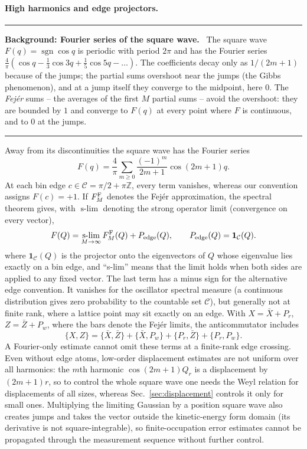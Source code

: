 \documentclass[11pt,a4paper]{article}
\newcommand{\sgn}{\operatorname{sgn}}
\newenvironment{background}[1]{\par\medskip\noindent\hrule\smallskip\noindent\textbf{Background: #1.}\ \ignorespaces}{\par\smallskip\noindent\hrule\medskip}
\begin{document}
\paragraph{High harmonics and edge projectors.}
\begin{background}{Fourier series of the square wave}
The square wave $F(q)=\sgn\cos q$ is periodic with period $2\pi$ and has the Fourier series $\frac4\pi(\cos q-\frac13\cos3q+\frac15\cos5q-\dots)$. The coefficients decay only as $1/(2m+1)$ because of the jumps; the partial sums overshoot near the jumps (the Gibbs phenomenon), and at a jump itself they converge to the midpoint, here $0$. The \emph{Fej\'er} sums -- the averages of the first $M$ partial sums -- avoid the overshoot: they are bounded by $1$ and converge to $F(q)$ at every point where $F$ is continuous, and to $0$ at the jumps.
\end{background}
Away from its discontinuities the square wave has the Fourier series
\begin{equation*}
F(q)=\frac4\pi\sum_{m\ge0}\frac{(-1)^m}{2m+1}\cos(2m+1)q .
\end{equation*}
At each bin edge $c\in\mathcal C=\pi/2+\pi\mathbb Z$, every term vanishes, whereas our convention assigns $F(c)=+1$. If $F_M^{\rm F}$ denotes the Fej\'er approximation, the spectral theorem gives, with $\operatorname{s-lim}$ denoting the strong operator limit (convergence on every vector),
\begin{equation}
F(Q)=\operatorname*{s-lim}_{M\to\infty}F_M^{\rm F}(Q)+P_{\rm edge}(Q),\qquad
P_{\rm edge}(Q)=\mathbf1_{\mathcal C}(Q).
\label{eq:edgeFourier}
\end{equation}
where $\mathbf1_{\mathcal C}(Q)$ is the projector onto the eigenvectors of $Q$ whose eigenvalue lies exactly on a bin edge, and ``s-lim'' means that the limit holds when both sides are applied to any fixed vector. The last term has a minus sign for the alternative edge convention. It vanishes for the oscillator spectral measure (a continuous distribution gives zero probability to the countable set $\mathcal C$), but generally not at finite rank, where a lattice point may sit exactly on an edge. With $X=\bar X+P_r$, $Z=\bar Z+P_w$, where the bars denote the Fej\'er limits, the anticommutator includes
\begin{equation}
\{X,Z\}=\{\bar X,\bar Z\}+\{\bar X,P_w\}+\{P_r,\bar Z\}+\{P_r,P_w\}.
\label{eq:edgeAnti}
\end{equation}
A Fourier-only estimate cannot omit these terms at a finite-rank edge crossing. Even without edge atoms, low-order displacement estimates are not uniform over all harmonics: the $m$th harmonic $\cos(2m+1)Q_r$ is a displacement by $(2m+1)r$, so to control the whole square wave one needs the Weyl relation for displacements of all sizes, whereas Sec.~\ref{sec:displacement} controls it only for small ones. Multiplying the limiting Gaussian by a position square wave also creates jumps and takes the vector outside the kinetic-energy form domain (its derivative is not square-integrable), so finite-occupation error estimates cannot be propagated through the measurement sequence without further control.
\end{document}
